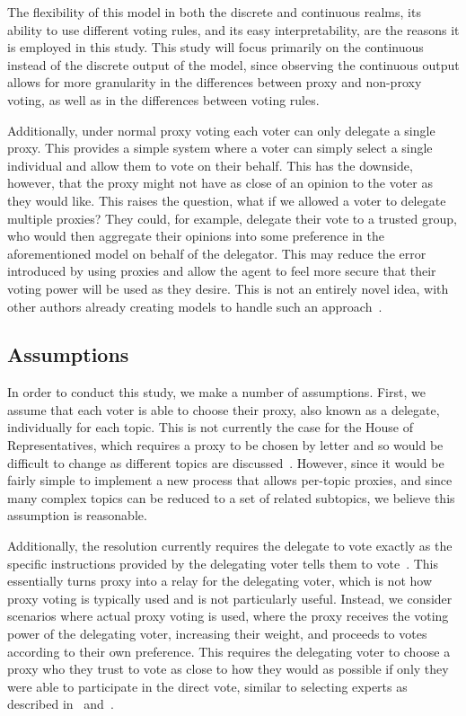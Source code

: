 The flexibility of this model in both the discrete and continuous realms, its ability
to use different voting rules, and its easy interpretability, are the reasons it is
employed in this study.
This study will focus primarily on the continuous instead of the discrete output of
the model, since observing the continuous output allows for more granularity in the
differences between proxy and non-proxy voting, as well as in the differences between
voting rules.

Additionally, under normal proxy voting each voter can only delegate a single proxy.
This provides a simple system where a voter can simply select a single individual and
allow them to vote on their behalf.
This has the downside, however, that the proxy might not have as close of an opinion
to the voter as they would like.
This raises the question, what if we allowed a voter to delegate multiple proxies?
They could, for example, delegate their vote to a trusted group, who would then
aggregate their opinions into some preference in the aforementioned model on behalf of
the delegator.
This may reduce the error introduced by using proxies and allow the agent to feel
more secure that their voting power will be used as they desire.
This is not an entirely novel idea, with other authors already creating models to
handle such an approach~\cite{Degrave2014,Colley2021,Golz2021}.

\subsection{Assumptions}\label{subsec:assumptions}
In order to conduct this study, we make a number of assumptions.
First, we assume that each voter is able to choose their proxy, also known as a
delegate, individually for each topic.
This is not currently the case for the House of Representatives, which requires
a proxy to be chosen by letter and so would be difficult to change as different
topics are discussed~\cite{Congress.gov2020}.
However, since it would be fairly simple to implement a new process that allows
per-topic proxies, and since many complex topics can be reduced to a set of related
subtopics, we believe this assumption is reasonable.

Additionally, the resolution currently requires the delegate to vote exactly as the
specific instructions provided by the delegating voter tells them to
vote~\cite{CERP2020, Congress.gov2020}.
This essentially turns proxy into a relay for the delegating voter, which is not how
proxy voting is typically used and is not particularly useful.
Instead, we consider scenarios where actual proxy voting is used, where the proxy
receives the voting power of the delegating voter, increasing their weight, and
proceeds to votes according to their own preference.
This requires the delegating voter to choose a proxy who they trust to vote as close
to how they would as possible if only they were able to participate in the direct vote,
similar to selecting experts as described in~\cite{Miller1969} and~\cite{Mueller1972}.

